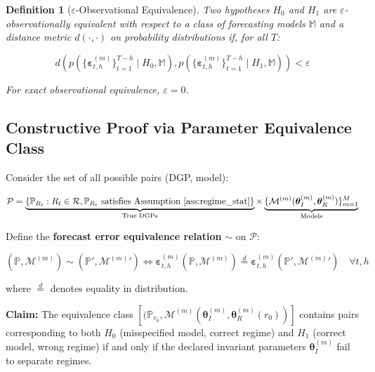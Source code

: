\documentclass[12pt,a4paper]{article}
\newtheorem{definition}[theorem]{Definition}
\begin{document}
\begin{definition}[$\varepsilon$-Observational Equivalence]
Two hypotheses $H_0$ and $H_1$ are $\varepsilon$-observationally
equivalent with respect to a class of forecasting models $\mathbb{M}$
and a distance metric $d(\cdot, \cdot)$ on probability distributions
if, for all $T$:

\begin{equation}
    d\left(p\left(\{\boldsymbol{\varepsilon}_{t,h}^{(m)}\}_{t=1}^{T-h}
    \mid H_0, \mathbb{M}\right),
    p\left(\{\boldsymbol{\varepsilon}_{t,h}^{(m)}\}_{t=1}^{T-h}
    \mid H_1, \mathbb{M}\right)\right) < \varepsilon
    \label{eq:eps_obs_equiv}
\end{equation}

For exact observational equivalence, $\varepsilon = 0$.
\end{definition}

\subsection{Constructive Proof via Parameter Equivalence Class}

Consider the set of all possible pairs (DGP, model):

\begin{equation}
    \mathcal{P} = \underbrace{\{\mathbb{P}_{R_t} : R_t \in \mathcal{R},
    \mathbb{P}_{R_t} \text{ satisfies Assumption~\ref{ass:regime_stat}}\}}
    _{\text{True DGPs}} \times
    \underbrace{\{\mathcal{M}^{(m)}(\boldsymbol{\theta}^{(m)}_I,
    \boldsymbol{\theta}^{(m)}_R)\}_{m=1}^{M}}
    _{\text{Models}} \label{eq:product_space}
\end{equation}

Define the \textbf{forecast error equivalence relation} $\sim$ on
$\mathcal{P}$:

\begin{equation}
    (\mathbb{P}, \mathcal{M}^{(m)}) \sim
    (\mathbb{P}', {\mathcal{M}^{(m)}}') \iff
    \boldsymbol{\varepsilon}_{t,h}^{(m)}(\mathbb{P}, \mathcal{M}^{(m)})
    \stackrel{d}{=}
    \boldsymbol{\varepsilon}_{t,h}^{(m)}(\mathbb{P}',
    {\mathcal{M}^{(m)}}') \quad \forall t, h \label{eq:equiv_rel}
\end{equation}

where $\stackrel{d}{=}$ denotes equality in distribution.

\textbf{Claim:} The equivalence class $[(\mathbb{P}_{r_0},
\mathcal{M}^{(m)}(\boldsymbol{\theta}^{(m)}_I,
\boldsymbol{\theta}^{(m)}_R(r_0))]$ contains pairs corresponding to
both $H_0$ (misspecified model, correct regime) and $H_1$ (correct
model, wrong regime) if and only if the declared invariant parameters
$\boldsymbol{\theta}^{(m)}_I$ fail to separate regimes.
\end{document}
